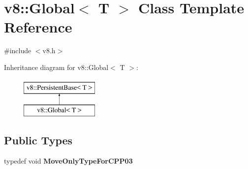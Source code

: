 \hypertarget{classv8_1_1Global}{}\section{v8\+:\+:Global$<$ T $>$ Class Template Reference}
\label{classv8_1_1Global}


{\ttfamily \#include $<$v8.\+h$>$}

Inheritance diagram for v8\+:\+:Global$<$ T $>$\+:\begin{figure}[H]
\begin{center}
\leavevmode
\includegraphics[height=2.000000cm]{classv8_1_1Global}
\end{center}
\end{figure}
\subsection*{Public Types}
\begin{DoxyCompactItemize}
\item 
\mbox{\label{classv8_1_1Global_a295826e79781fe585904e652884db72f}} 
typedef void {\bfseries Move\+Only\+Type\+For\+C\+P\+P03}
\end{DoxyCompactItemize}
